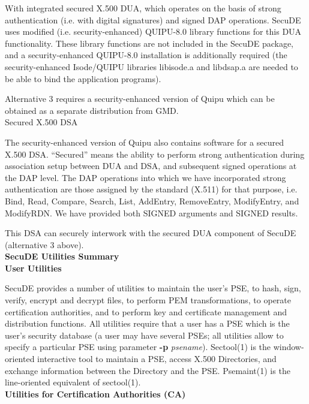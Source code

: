 \m With integrated secured X.500 DUA, which operates on the basis of
   strong authentication (i.e. with digital signatures) and signed DAP
   operations.
   SecuDE uses modified (i.e. security-enhanced) QUIPU-8.0 library 
   functions for this DUA functionality. These library functions are not 
   included in the SecuDE package, and a security-enhanced QUIPU-8.0 
   installation is additionally required (the security-enhanced 
   Isode/QUIPU libraries libisode.a and libdsap.a are needed to be able 
   to bind the application programs).
\ee

Alternative 3 requires a security-enhanced version of Quipu which can
be obtained as a separate distribution from GMD. 
\\ [1em]
Secured X.500 DSA

The security-enhanced version of Quipu also contains software for a secured 
X.500 DSA. ``Secured'' means the ability to perform strong authentication 
during association setup between DUA and DSA, and subsequent signed 
operations at the DAP level. The DAP operations into which we have 
incorporated strong authentication are those assigned by the standard 
(X.511) for that purpose, i.e. Bind, Read, Compare, Search, List, AddEntry,
RemoveEntry, ModifyEntry, and ModifyRDN. We have provided both SIGNED 
arguments and SIGNED results.

This DSA can securely interwork with the secured DUA component of SecuDE 
(alternative 3 above).
\\ [1em]

{\large\bf SecuDE Utilities Summary}
\\[1em]
{\bf User Utilities}

SecuDE provides a number 
of utilities to maintain the user's PSE, to hash, sign, verify, 
encrypt and decrypt files, to perform PEM transformations, to
operate certification authorities, and to perform key and certificate
management and distribution functions. All utilities require that
a user has a PSE which is the user's security database (a user may have
several PSEs; all utilities allow to specify a particular PSE using
parameter {\bf -p} {\em psename}). Sectool(1) is the window-oriented
interactive tool to maintain a PSE, access X.500 Directories, and
exchange information between the Directory and the PSE.
Psemaint(1) is the line-oriented equivalent of sectool(1).   
\\ [1em]
{\bf Utilities for Certification Authorities (CA)}
 

